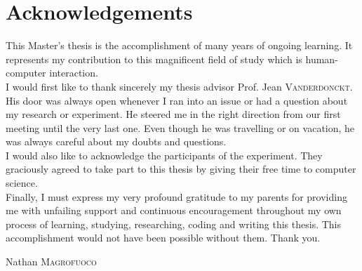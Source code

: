 \chapter*{Acknowledgements}

This Master's thesis is the accomplishment of many years of ongoing learning. 
It represents my contribution to this magnificent field of study which is 
human-computer interaction.\\

I would first like to thank sincerely my thesis advisor Prof. Jean
\textsc{Vanderdonckt}. His door was always open whenever I ran into an issue 
or had a question about my research or experiment. He steered me in the 
right direction from our first meeting until the very last one. Even though he 
was travelling or on vacation, he was always careful about my doubts and 
questions.\\

I would also like to acknowledge the participants of the experiment. They 
graciously agreed to take part to this thesis by giving their free time to 
computer science.\\

Finally, I must express my very profound gratitude to my parents for 
providing me with unfailing support and continuous encouragement throughout my 
own process of learning, studying, researching, coding and writing this 
thesis. This accomplishment would not have been possible without them. Thank 
you.\\

\begin{flushright}
Nathan \textsc{Magrofuoco}
\end{flushright}

\null\newpage